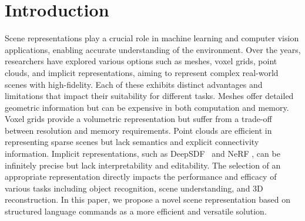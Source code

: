 \vspace{-1em}

\section{Introduction}
\label{section:intro}

Scene representations play a crucial role in machine learning and computer vision applications, enabling accurate understanding of the environment. Over the years, researchers have explored various options such as meshes, voxel grids, point clouds, and implicit representations, aiming to represent complex real-world scenes with high-fidelity. Each of these exhibits distinct advantages and limitations that impact their suitability for different tasks. Meshes offer detailed geometric information but can be expensive in both computation and memory. Voxel grids provide a volumetric representation but suffer from a trade-off between resolution and memory requirements. Point clouds are efficient in representing sparse scenes but lack semantics and explicit connectivity information. Implicit representations, such as DeepSDF~\cite{park2019deepsdf} and NeRF \cite{mildenhall2021nerf}, can be infinitely precise but lack interpretability and editability. The selection of an appropriate representation directly impacts the performance and efficacy of various tasks including object recognition, scene understanding, and 3D reconstruction. In this paper, we propose a novel scene representation based on structured language commands as a more efficient and versatile solution.


